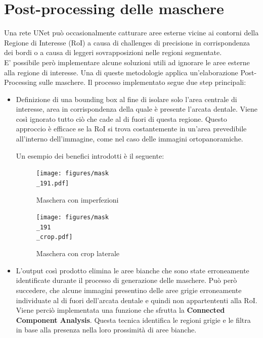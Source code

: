 \documentclass[12pt,a4paper,openright,twoside]{book}
\begin{document}
\section{Post-processing delle maschere} 
Una rete UNet può occasionalmente catturare aree esterne vicine ai contorni della Regione di Interesse (RoI) a causa di challenges di precisione in corrispondenza dei bordi o a causa di leggeri sovrapposizioni nelle regioni segmentate.\\
E' possibile però implementare alcune soluzioni utili ad ignorare le aree esterne alla regione di interesse. Una di queste metodologie applica un'elaborazione Post-Processing sulle maschere. Il processo implementato segue due step principali:
\begin{itemize}
\item Definizione di una bounding box al fine di isolare solo l'area centrale di interesse, area in corrispondenza della quale è presente l'arcata dentale. Viene così ignorato tutto ciò che cade al di fuori di questa regione. Questo approccio è efficace se la RoI si trova costantemente in un'area prevedibile all'interno dell'immagine, come nel caso delle immagini ortopanoramiche.
\begin{figure}[H]
    \centering
    
\end{figure}
Un esempio dei benefici introdotti è il seguente: 
\begin{figure}[H]
    \centering
    \begin{minipage}{0.45\textwidth}
	\centering
    	\texttt{[image: figures/mask\\\_191.pdf]}
    	\caption{Maschera con imperfezioni}
    	\label{lab:Maschera imperfetta}
    \end{minipage}\hfill
    \begin{minipage}{0.45\textwidth}
    	\centering
    	\texttt{[image: figures/mask\\\_191\\\_crop.pdf]}
    	\caption{Maschera con crop laterale}
    	\label{lab:Maschera dilatata}
    \end{minipage}\hfill
\end{figure}
\item L'output così prodotto elimina le aree bianche che sono state erroneamente identificate durante il processo di generazione delle maschere. Può però succedere, che alcune immagini presentino delle aree grigie erroneamente individuate al di fuori dell'arcata dentale e quindi non appartententi alla RoI. Viene perciò implementata una funzione che sfrutta la \textbf{Connected Component Analysis}. Questa tecnica identifica le regioni grigie e le filtra in base alla presenza nella loro prossimità di aree bianche. 

\end{itemize}
\end{document}
